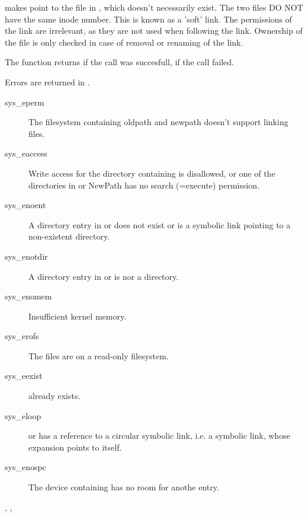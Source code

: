 

{ makes  point to the file in , which doesn't
necessarily exist. The two files DO NOT have the same inode number.
This is known as a 'soft' link.
The permissions of the link are irrelevant, as they are not used when
following the link. Ownership of the file is only checked in case of removal
or renaming of the link.

The function returns  if the call was succesfull,  if the call
failed.
}
{ Errors are returned in .
\begin{description}
\item[sys\_eperm] The filesystem containing oldpath and newpath doesn't
support linking files.
\item[sys\_eaccess] Write access for the directory containing 
is disallowed, or one of the directories in  or {NewPath} has no
search (=execute) permission.
\item[sys\_enoent] A directory entry in  or  does
not exist or is a symbolic link pointing to a non-existent directory.
\item[sys\_enotdir] A directory entry in  or  is
nor a directory.
\item[sys\_enomem] Insufficient kernel memory.
\item[sys\_erofs] The files are on a read-only filesystem.
\item[sys\_eexist]  already exists.
\item[sys\_eloop]  or  has a reference to a circular
symbolic link, i.e. a symbolic link, whose expansion points to itself.
\item[sys\_enospc] The device containing  has no room for anothe
entry.
\end{description}
}
{, ,  }



